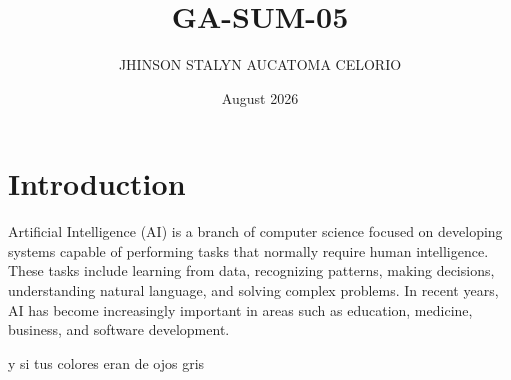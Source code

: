\documentclass{article}
\title{GA-SUM-05}
\author{JHINSON STALYN AUCATOMA CELORIO}
\date{August 2026}
\begin{document}
\maketitle

\section{Introduction}
Artificial Intelligence (AI) is a branch of computer science focused on
developing systems capable of performing tasks that normally require human
intelligence. These tasks include learning from data, recognizing patterns,
making decisions, understanding natural language, and solving complex
problems. In recent years, AI has become increasingly important in areas such
as education, medicine, business, and software development.

 y si tus colores eran de ojos gris
\end{document}
